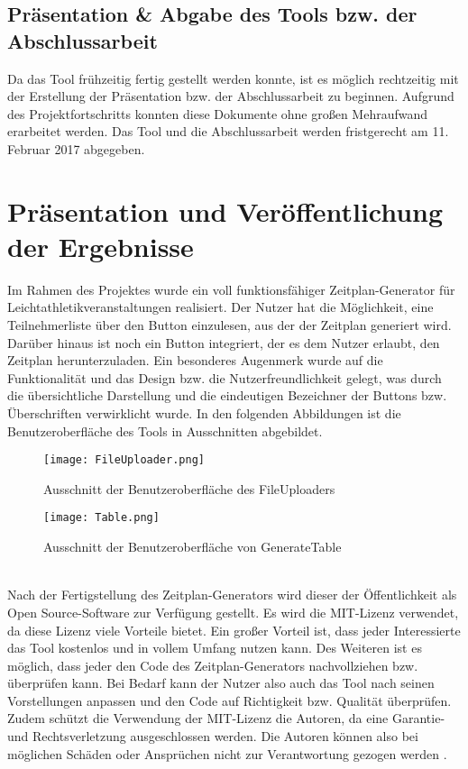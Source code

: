 \subsection{Präsentation \& Abgabe des Tools bzw. der Abschlussarbeit}
Da das Tool frühzeitig fertig gestellt werden konnte, ist es möglich rechtzeitig mit der Erstellung der Präsentation bzw. der Abschlussarbeit zu beginnen. Aufgrund des Projektfortschritts konnten diese Dokumente ohne großen Mehraufwand erarbeitet werden. Das Tool und die Abschlussarbeit werden fristgerecht am 11. Februar 2017 abgegeben.

\section{Präsentation und Veröffentlichung der Ergebnisse}
Im Rahmen des Projektes wurde ein voll funktionsfähiger Zeitplan-Generator für Leichtathletikveranstaltungen realisiert. Der Nutzer hat die Möglichkeit, eine Teilnehmerliste über den Button einzulesen, aus der der Zeitplan generiert wird. Darüber hinaus ist noch ein Button integriert, der es dem Nutzer erlaubt, den Zeitplan herunterzuladen. Ein besonderes Augenmerk wurde auf die Funktionalität und das Design bzw. die Nutzerfreundlichkeit gelegt, was durch die übersichtliche Darstellung und die eindeutigen Bezeichner der Buttons bzw. Überschriften verwirklicht wurde. In den folgenden Abbildungen ist die Benutzeroberfläche des Tools in Ausschnitten abgebildet.
\begin{figure}[htbp]
  \centering
  \texttt{[image: FileUploader.png]}
  \caption{Ausschnitt der Benutzeroberfläche des FileUploaders}
  \label{fig:Fig1}
\end{figure}
\begin{figure}[htbp]
  \centering
  \texttt{[image: Table.png]}
  \caption{Ausschnitt der Benutzeroberfläche von GenerateTable}
  \label{fig:Fig1}
\end{figure}\\
Nach der Fertigstellung des Zeitplan-Generators wird dieser der Öffentlichkeit als Open Source-Software zur Verfügung gestellt. Es wird die MIT-Lizenz verwendet, da diese Lizenz viele Vorteile bietet. Ein großer Vorteil ist, dass jeder Interessierte das Tool kostenlos und in vollem Umfang nutzen kann. Des Weiteren ist es möglich, dass jeder den Code des Zeitplan-Generators nachvollziehen bzw. überprüfen kann. Bei Bedarf kann der Nutzer also auch das Tool nach seinen Vorstellungen anpassen und den Code auf Richtigkeit bzw. Qualität überprüfen. Zudem schützt die Verwendung der MIT-Lizenz die Autoren, da eine Garantie- und Rechtsverletzung ausgeschlossen werden. Die Autoren können also bei möglichen Schäden oder Ansprüchen nicht zur Verantwortung gezogen werden \cite{mitlicense}. \\

